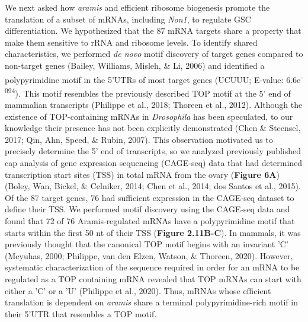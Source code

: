 \documentclass[12pt,oneside]{reedthesis}
\begin{document}
We next asked how \emph{aramis} and efficient ribosome biogenesis promote the
translation of a subset of mRNAs, including \emph{Non1}, to regulate GSC
differentiation. We hypothesized that the 87 mRNA targets share a
property that make them sensitive to rRNA and ribosome levels. To
identify shared characteristics, we performed \emph{de novo} motif discovery
of target genes compared to non-target genes (Bailey, Williams, Misleh, \& Li, 2006) and
identified a polypyrimidine motif in the 5'UTRs of most target genes
(UCUUU; E-value: 6.6e\textsuperscript{-094}). This motif resembles the previously
described TOP motif at the 5' end of mammalian transcripts
(Philippe et al., 2018; Thoreen et al., 2012). Although the existence of
TOP-containing mRNAs in \emph{Drosophila} has been speculated, to our
knowledge their presence has not been explicitly demonstrated
(Chen \& Steensel, 2017; Qin, Ahn, Speed, \& Rubin, 2007). This observation motivated us to
precisely determine the 5' end of transcripts, so we analyzed previously
published {c}ap {a}nalysis of {g}ene
{e}xpression sequencing (CAGE-seq) data that had determined
transcription start sites (TSS) in total mRNA from the ovary (\textbf{Figure
6A}) (Boley, Wan, Bickel, \& Celniker, 2014; Chen et al., 2014; dos Santos et al., 2015). Of the 87 target genes,
76 had sufficient expression in the CAGE-seq dataset to define their
TSS. We performed motif discovery using the CAGE-seq data and found that
72 of 76 Aramis-regulated mRNAs have a polypyrimidine motif that starts
within the first 50 nt of their TSS (\textbf{Figure 2.11B-C}). In mammals, it
was previously thought that the canonical TOP motif begins with an
invariant 'C' (Meyuhas, 2000; Philippe, van den Elzen, Watson, \& Thoreen, 2020). However, systematic
characterization of the sequence required in order for an mRNA to be
regulated as a TOP containing mRNA revealed that TOP mRNAs can start
with either a 'C' or a 'U' (Philippe et al., 2020). Thus,
mRNAs whose efficient translation is dependent on \emph{aramis} share a
terminal polypyrimidine-rich motif in their 5'UTR that resembles a TOP
motif.
\end{document}
